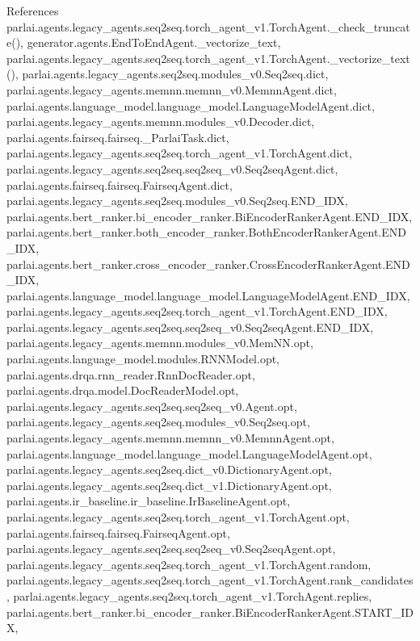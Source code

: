 References parlai.\+agents.\+legacy\+\_\+agents.\+seq2seq.\+torch\+\_\+agent\+\_\+v1.\+Torch\+Agent.\+\_\+check\+\_\+truncate(), generator.\+agents.\+End\+To\+End\+Agent.\+\_\+vectorize\+\_\+text, parlai.\+agents.\+legacy\+\_\+agents.\+seq2seq.\+torch\+\_\+agent\+\_\+v1.\+Torch\+Agent.\+\_\+vectorize\+\_\+text(), parlai.\+agents.\+legacy\+\_\+agents.\+seq2seq.\+modules\+\_\+v0.\+Seq2seq.\+dict, parlai.\+agents.\+legacy\+\_\+agents.\+memnn.\+memnn\+\_\+v0.\+Memnn\+Agent.\+dict, parlai.\+agents.\+language\+\_\+model.\+language\+\_\+model.\+Language\+Model\+Agent.\+dict, parlai.\+agents.\+legacy\+\_\+agents.\+memnn.\+modules\+\_\+v0.\+Decoder.\+dict, parlai.\+agents.\+fairseq.\+fairseq.\+\_\+\+Parlai\+Task.\+dict, parlai.\+agents.\+legacy\+\_\+agents.\+seq2seq.\+torch\+\_\+agent\+\_\+v1.\+Torch\+Agent.\+dict, parlai.\+agents.\+legacy\+\_\+agents.\+seq2seq.\+seq2seq\+\_\+v0.\+Seq2seq\+Agent.\+dict, parlai.\+agents.\+fairseq.\+fairseq.\+Fairseq\+Agent.\+dict, parlai.\+agents.\+legacy\+\_\+agents.\+seq2seq.\+modules\+\_\+v0.\+Seq2seq.\+E\+N\+D\+\_\+\+I\+DX, parlai.\+agents.\+bert\+\_\+ranker.\+bi\+\_\+encoder\+\_\+ranker.\+Bi\+Encoder\+Ranker\+Agent.\+E\+N\+D\+\_\+\+I\+DX, parlai.\+agents.\+bert\+\_\+ranker.\+both\+\_\+encoder\+\_\+ranker.\+Both\+Encoder\+Ranker\+Agent.\+E\+N\+D\+\_\+\+I\+DX, parlai.\+agents.\+bert\+\_\+ranker.\+cross\+\_\+encoder\+\_\+ranker.\+Cross\+Encoder\+Ranker\+Agent.\+E\+N\+D\+\_\+\+I\+DX, parlai.\+agents.\+language\+\_\+model.\+language\+\_\+model.\+Language\+Model\+Agent.\+E\+N\+D\+\_\+\+I\+DX, parlai.\+agents.\+legacy\+\_\+agents.\+seq2seq.\+torch\+\_\+agent\+\_\+v1.\+Torch\+Agent.\+E\+N\+D\+\_\+\+I\+DX, parlai.\+agents.\+legacy\+\_\+agents.\+seq2seq.\+seq2seq\+\_\+v0.\+Seq2seq\+Agent.\+E\+N\+D\+\_\+\+I\+DX, parlai.\+agents.\+legacy\+\_\+agents.\+memnn.\+modules\+\_\+v0.\+Mem\+N\+N.\+opt, parlai.\+agents.\+language\+\_\+model.\+modules.\+R\+N\+N\+Model.\+opt, parlai.\+agents.\+drqa.\+rnn\+\_\+reader.\+Rnn\+Doc\+Reader.\+opt, parlai.\+agents.\+drqa.\+model.\+Doc\+Reader\+Model.\+opt, parlai.\+agents.\+legacy\+\_\+agents.\+seq2seq.\+seq2seq\+\_\+v0.\+Agent.\+opt, parlai.\+agents.\+legacy\+\_\+agents.\+seq2seq.\+modules\+\_\+v0.\+Seq2seq.\+opt, parlai.\+agents.\+legacy\+\_\+agents.\+memnn.\+memnn\+\_\+v0.\+Memnn\+Agent.\+opt, parlai.\+agents.\+language\+\_\+model.\+language\+\_\+model.\+Language\+Model\+Agent.\+opt, parlai.\+agents.\+legacy\+\_\+agents.\+seq2seq.\+dict\+\_\+v0.\+Dictionary\+Agent.\+opt, parlai.\+agents.\+legacy\+\_\+agents.\+seq2seq.\+dict\+\_\+v1.\+Dictionary\+Agent.\+opt, parlai.\+agents.\+ir\+\_\+baseline.\+ir\+\_\+baseline.\+Ir\+Baseline\+Agent.\+opt, parlai.\+agents.\+legacy\+\_\+agents.\+seq2seq.\+torch\+\_\+agent\+\_\+v1.\+Torch\+Agent.\+opt, parlai.\+agents.\+fairseq.\+fairseq.\+Fairseq\+Agent.\+opt, parlai.\+agents.\+legacy\+\_\+agents.\+seq2seq.\+seq2seq\+\_\+v0.\+Seq2seq\+Agent.\+opt, parlai.\+agents.\+legacy\+\_\+agents.\+seq2seq.\+torch\+\_\+agent\+\_\+v1.\+Torch\+Agent.\+random, parlai.\+agents.\+legacy\+\_\+agents.\+seq2seq.\+torch\+\_\+agent\+\_\+v1.\+Torch\+Agent.\+rank\+\_\+candidates, parlai.\+agents.\+legacy\+\_\+agents.\+seq2seq.\+torch\+\_\+agent\+\_\+v1.\+Torch\+Agent.\+replies, parlai.\+agents.\+bert\+\_\+ranker.\+bi\+\_\+encoder\+\_\+ranker.\+Bi\+Encoder\+Ranker\+Agent.\+S\+T\+A\+R\+T\+\_\+\+I\+DX, 